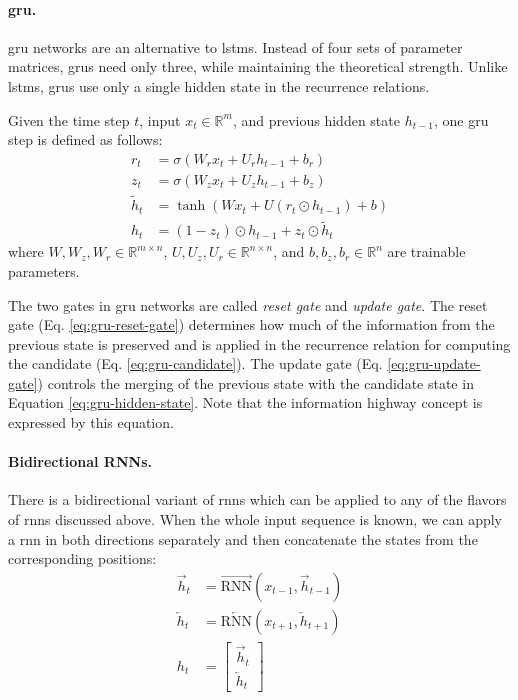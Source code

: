 \paragraph{\acs{gru}.} \acl{gru} networks \citep{cho2014gru} are an alternative
to \acp{lstm}. Instead of four sets of parameter matrices, \acp{gru} need only
three, while maintaining the theoretical strength. Unlike \acp{lstm}, \acp{gru}
use only a single hidden state in the recurrence relations.

Given the time step $t$, input $x_t \in \mathbb{R}^m$, and previous hidden
state $h_{t-1}$, one \ac{gru} step is defined as follows:
%
\begin{align}
  r_t &= \sigma\left(W_r x_t + U_r h_{t-1} + b_r\right) \label{eq:gru-reset-gate} \\
  z_t &= \sigma\left(W_z x_t + U_z h_{t-1} + b_z\right) \label{eq:gru-update-gate} \\
  \tilde{h}_t &= \tanh \left(W x_t + U \left( r_t \odot h_{t-1} \right) + b \right) \label{eq:gru-candidate} \\
  h_t &= (1 - z_t) \odot h_{t-1} + z_t \odot \tilde{h}_t \label{eq:gru-hidden-state}
\end{align}
%
where $W, W_z, W_r \in \mathbb{R}^{m\times n}$,
$U, U_z, U_r \in \mathbb{R}^{n \times n}$, and $b, b_z, b_r \in \mathbb{R}^n$
are trainable parameters.

The two gates in \ac{gru} networks are called \emph{reset gate} and
\emph{update gate}.  The reset gate (Eq. \ref{eq:gru-reset-gate}) determines
how much of the information from the previous state is preserved and is applied
in the recurrence relation for computing the candidate
(Eq. \ref{eq:gru-candidate}). The update gate (Eq.  \ref{eq:gru-update-gate})
controls the merging of the previous state with the candidate state in Equation
\ref{eq:gru-hidden-state}. Note that the information highway concept is
expressed by this equation.

\paragraph{Bidirectional RNNs.} There is a bidirectional variant of \acp{rnn}
which can be applied to any of the flavors of \acp{rnn} discussed above. When
the whole input sequence is known, we can apply a \ac{rnn} in both directions
separately and then concatenate the states from the corresponding positions:
%
\begin{align}
  \overrightarrow{h}_t &= \overrightarrow{\mathrm{RNN}}(x_{t-1}, \overrightarrow{h}_{t-1}) \\
  \overleftarrow{h}_t &= \overleftarrow{\mathrm{RNN}}(x_{t+1}, \overleftarrow{h}_{t+1}) \\
  h_t &= \left[ \begin{matrix} \overrightarrow{h}_t \\ \overleftarrow{h}_t \end{matrix} \right]
\end{align}

